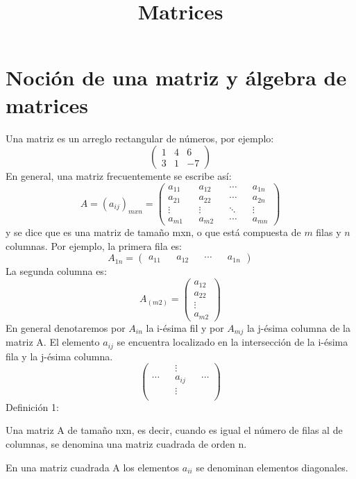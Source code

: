 \documentclass[twocolumn]{article}
\title{Matrices}
\begin{document}
\date{}
\maketitle
\section{Noci\'on de una matriz y \'algebra de matrices}

Una matriz es un arreglo rectangular de n\'umeros, por ejemplo:
$$
\begin{pmatrix}
1 & 4 & 6 \\
3 & 1 & -7 
\end{pmatrix}
$$
En general, una matriz frecuentemente se escribe as\'i:
$$
A = (a_{ij})_{mxn} =
\begin{pmatrix}
a_{11} && a_{12} && \cdots && a_{1n} \\
a_{21} && a_{22} && \cdots && a_{2n} \\
\vdots && \vdots && \ddots && \vdots \\
a_{m1} && a_{m2} && \cdots && a_{mn}
\end{pmatrix}
$$
y se dice que es una matriz de tamaño mxn, o que est\'a compuesta de $m$ filas y $n$
columnas. Por ejemplo, la primera fila es:
$$
A_{1n}= 
\begin{pmatrix}
a_{11} && a_{12} && \cdots && a_{1n}
\end{pmatrix}
$$
La segunda columna es:
$$
A_(m2)=
\begin{pmatrix}
a_{12} \\
a_{22} \\
\vdots \\
a_{m2} 
\end{pmatrix}
$$
En general denotaremos por $A_{in}$ la i-\'esima fil y por $A_{mj}$ la j-\'esima columna de
la matriz A. El elemento $a_{ij}$ se encuentra localizado en la intersecci\'on de la 
i-\'esima fila y la j-\'esima columna. 
$$
\begin{pmatrix}
 && \vdots && \\
 \cdots && a_{ij} && \cdots \\
 && \vdots && \\
\end{pmatrix}
$$
Definici\'on 1:

Una matriz A de tamaño nxn, es decir, cuando es igual el n\'umero de filas al de columnas,
se denomina una matriz cuadrada de orden n.

En una matriz cuadrada A los elementos $a_{ii}$ se denominan elementos diagonales.
\end{document}
